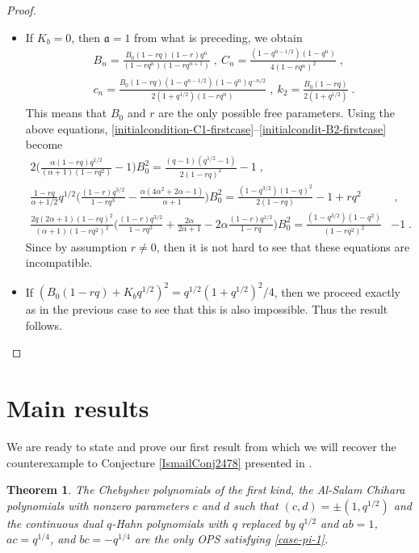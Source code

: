 \documentclass{amsart}
\newtheorem{theorem}{Theorem}[section]
\theoremstyle{remark}
\numberwithin{equation}{section}
\begin{document}
\begin{proof}
\begin{itemize}
\item[i-]If $K_b=0$, then $\mathfrak{a}=1$ from what is preceding, we obtain
\begin{align*}
&B_n=\frac{B_0(1-rq)(1-r)q^n}{(1-rq^n)(1-rq^{n+1})}\;,~C_n=\frac{(1-q^{n-1/2})(1-q^n)}{4(1-rq^n)^2}\;,\\
&c_n=\frac{B_0(1-rq)(1-q^{n-1/2})(1-q^n)q^{-n/2}}{2(1+q^{1/2})(1-rq^n)}\;,~k_2=\frac{B_0(1-rq)}{2(1+q^{1/2})}\;.
\end{align*}
This means that $B_0$ and $r$ are the only possible free parameters. Using the above equations, \eqref{initialcondition-C1-firstcase}--\eqref{initialcondit-B2-firstcase} become
\begin{align*}
2\Big(\frac{\alpha(1-rq)q^{1/2}}{(\alpha+1)(1-rq^2)}  -1\Big)B_0^2 =\frac{(q-1)(q^{1/2}-1)}{2(1-rq)^2}-1 \;,\quad \quad\quad \quad\quad\\
\frac{1-rq}{\alpha+1/2}q^{1/2}\Big(\frac{(1-r)q^{3/2}}{1-rq^3}  -\frac{\alpha(4\alpha^2+2\alpha-1)}{\alpha+1}\Big)B_0^2 =\frac{(1-q^{3/2})(1-q)^2}{2(1-rq)}-1+rq^2& \;,\\
\frac{2q(2\alpha+1)(1-rq)^2}{(\alpha+1)(1-rq^2)^2}\Big(\frac{(1-r)q^{3/2}}{1-rq^3}+\frac{2\alpha}{2\alpha+1}-2\alpha\frac{(1-r)q^{1/2}}{1-rq}  \Big)B_0^2 =\frac{(1-q^{3/2})(1-q^2)}{(1-rq^2)^2}&-1  \;.
\end{align*}
Since by assumption $r\neq 0$, then it is not hard to see that these equations are incompatible.
\item[ii-] If $(B_0(1-rq)+K_bq^{1/2})^2 =q^{1/2}(1+q^{1/2})^2/4$, then we proceed exactly as in the previous case to see that this is also impossible.
Thus the result follows.

\end{itemize}

\end{proof}


\section{Main results}
We are ready to state and prove our first result from which we will recover the counterexample to Conjecture \ref{IsmailConj2478} presented in \cite{KCDM2022}. 

\begin{theorem}\label{T1}
The Chebyshev polynomials of the first kind, the Al-Salam Chihara polynomials with nonzero parameters $c$ and $d$ such that $(c,d)=\pm (1,q^{1/2})$ and the continuous dual $q$-Hahn polynomials with $q$ replaced by $q^{1/2}$ and $ab=1$, $ac=q^{1/4}$, and $bc=-q^{1/4}$ are the only OPS  satisfying \eqref{case-pi-1}. 
\end{theorem}
\end{document}
